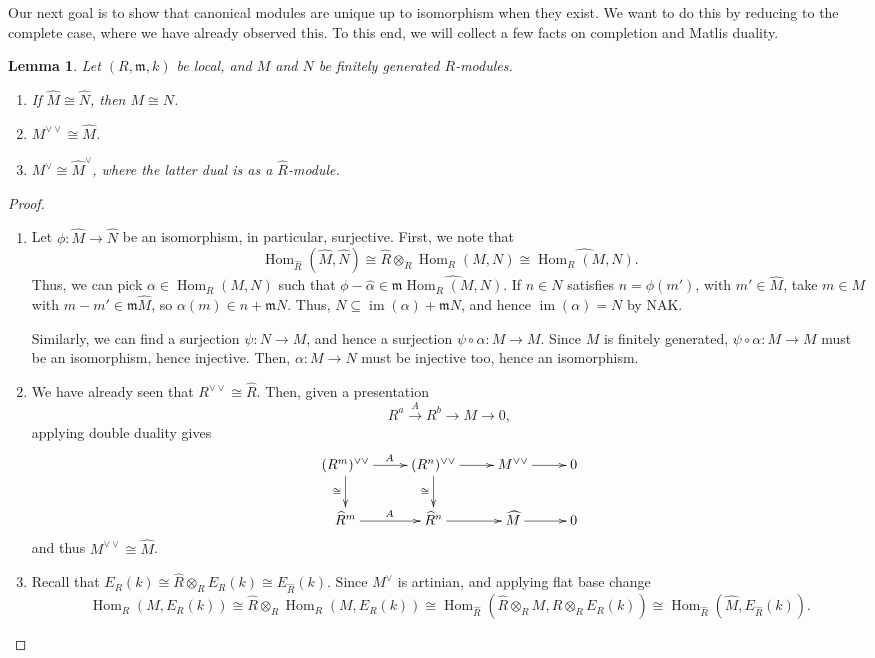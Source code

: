 \documentclass[11pt]{book}
\newtheorem{lemma}[theorem]{Lemma}
\numberwithin{equation}{section}
\numberwithin{theorem}{chapter}
\theoremstyle{definition}
\newtheorem*{basic properties}{Basic Properties}
\newtheorem*{Important Remark}{Important Remark}
\theoremstyle{remark}
\newcommand{\m}{\mathfrak{m}}
\newcommand{\Hom}{\operatorname{Hom}}
\DeclareMathOperator{\im}{im}
\begin{document}
Our next goal is to show that canonical modules are unique up to isomorphism when they exist. We want to do this by reducing to the complete case, where we have already observed this. To this end, we will  collect a few facts on completion and Matlis duality.

\begin{lemma}
	Let $(R,\m,k)$ be local, and $M$ and $N$ be finitely generated $R$-modules.\begin{enumerate}
		\item If $\widehat{M}\cong\widehat{N}$, then $M\cong N$.
		\item $M^{\vee\vee}\cong \widehat{M}$.
		\item $M^{\vee}\cong \widehat{M}^\vee$, where the latter dual is as a $\widehat{R}$-module.
	\end{enumerate}
\end{lemma}
\begin{proof}
	\begin{enumerate}
		\item Let $\phi:\widehat{M}\to\widehat{N}$ be an isomorphism, in particular, surjective. First, we note that \[\Hom_{\widehat{R}}(\widehat{M},\widehat{N})\cong \widehat{R}\otimes_R \Hom_R(M,N) \cong \widehat{\Hom_R(M,N)}.\]
		Thus, we can pick $\alpha\in \Hom_R(M,N)$ such that $\phi - \widehat{\alpha} \in \m \widehat{\Hom_R(M,N)}$. If $n\in N$ satisfies $n=\phi(m')$, with $m'\in \widehat{M}$, take $m\in M$ with $m-m'\in \m \widehat{M}$, so $\alpha(m)\in n + \m N$. Thus, $N\subseteq \im(\alpha)+\m N$, and hence $\im(\alpha)=N$ by NAK. 
		
		Similarly, we can find a surjection $\psi:N\to M$, and hence a surjection $\psi\circ \alpha:M\to M$. Since $M$ is finitely generated, $\psi\circ \alpha:M\to M$ must be an isomorphism, hence injective. Then, $\alpha:M\to N$ must be injective too, hence an isomorphism.
		
		\item We have already seen that $R^{\vee\vee}\cong \widehat{R}$. Then, given a presentation 
		\[ R^a \stackrel{A}{\longrightarrow} R^b \to M \to 0, \]
		applying double duality gives
			$$\xymatrix{(R^m)^{\vee\vee} \ar[d]_-{\cong} \ar[r]^A & (R^n)^{\vee\vee} \ar[d]_-{\cong} \ar[r] & M^{\vee\vee} \ar[r] & 0 \\
			\widehat{R}^m \ar[r]^A & \widehat{R}^n \ar[r] & \widehat{M} \ar[r] & 0}$$
		and thus $M^{\vee \vee}\cong \widehat{M}$.
		
		\item Recall that $E_R(k) \cong \widehat{R}\otimes_R E_R(k) \cong E_{\widehat{R}}(k)$. Since $M^\vee$ is artinian, and applying flat base change
		\[\Hom_R(M,E_R(k)) \cong \widehat{R}\otimes_R \Hom_R(M,E_R(k)) \cong  \Hom_{\widehat{R}}(\widehat{R}\otimes_R M,\widehat{R}\otimes_R E_R(k)) \cong \Hom_{\widehat{R}}(\widehat{M},E_{\widehat{R}}(k)).\]
	\end{enumerate}
\end{proof}
\end{document}
